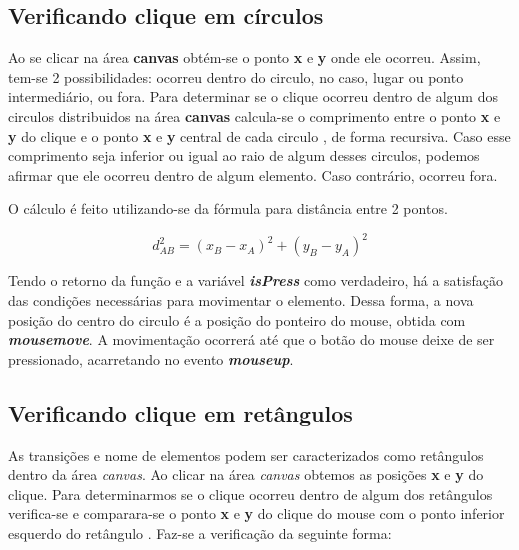\documentclass[
	12pt,				%
	openright,			%
	oneside,			%
	a4paper,			%
	english,			%
	brazil				%
	]{abntex2}
\theoremstyle{doispontos}
\begin{document}
\subsection{Verificando clique em círculos}

Ao se clicar na área \textbf{canvas} obtém-se o ponto \textbf{x} e \textbf{y} onde ele ocorreu. Assim, tem-se 2 possibilidades: ocorreu dentro do circulo, no caso, lugar ou ponto intermediário, ou fora. Para determinar se o clique ocorreu dentro de algum dos circulos distribuidos na área \textbf{canvas} calcula-se o comprimento entre o ponto \textbf{x} e \textbf{y} do clique e o ponto \textbf{x} e \textbf{y} central de cada circulo \textcite{Macoratti2014}, de forma recursiva. Caso esse comprimento seja inferior ou igual ao raio de algum desses circulos, podemos afirmar que ele ocorreu dentro de algum elemento. Caso contrário, ocorreu fora.

O cálculo é feito utilizando-se da fórmula para distância entre 2 pontos. 

\begin{equation}\label{eq:distancia_entre_pontos}
	d_{AB}^2 = (x_B - x_A)^2 + (y_B - y_A)^2
\end{equation}




Tendo o retorno da função e a variável \textbf{\textit{isPress}} como verdadeiro, há a satisfação das condições necessárias para movimentar o elemento. Dessa forma, a nova posição do centro do circulo é a posição do ponteiro do mouse, obtida com \textbf{\textit{mousemove}}. A movimentação ocorrerá até que o botão do mouse deixe de ser pressionado, acarretando no evento \textbf{\textit{mouseup}}. 

\subsection{Verificando clique em retângulos}

As transições e nome de elementos podem ser caracterizados como retângulos dentro da área \textit{canvas}. Ao clicar na área \textit{canvas} obtemos as posições \textbf{x} e \textbf{y} do clique. Para determinarmos se o clique ocorreu dentro de algum dos retângulos verifica-se e comparara-se o ponto \textbf{x} e \textbf{y} do clique do mouse com o ponto inferior esquerdo do retângulo \textcite{Manzoni2013}. Faz-se a verificação da seguinte forma:
\end{document}
